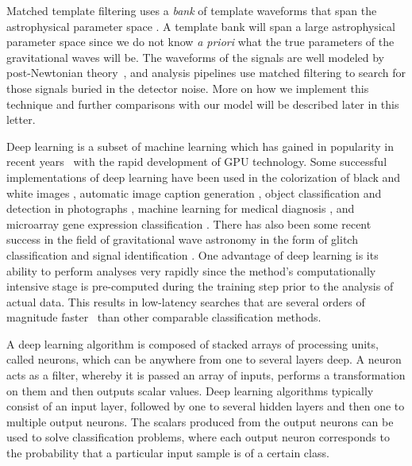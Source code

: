 \documentclass[%
 amsmath,amssymb,
 aps,
 twocolumn,
 prl,
 reprint,
floatfix,
]{revtex4-1}
\begin{document}
%
%
Matched template filtering uses a \textit{bank} of template waveforms that span
the astrophysical parameter space \cite{PhysRevD.44.3819, PhysRevD.49.1707,
PhysRevD.53.6749, PhysRevD.60.022002, 0264-9381-23-18-002, PhysRevD.80.104014, Blanchet2014, PhysRevD.89.061502}. A template bank will span a large astrophysical parameter space since we do not
know \textit{a priori} what the true parameters of the gravitational waves will
be. The waveforms of the signals are well modeled by post-Newtonian
theory~\cite{PhysRevD.84.049901,PhysRevD.80.084043,Blanchet2014,PhysRevD.93.084054},
and analysis pipelines use matched filtering to search for those signals buried
in the detector noise. More on how we implement this technique and further
comparisons with our model will be described later in this letter.

%
%
Deep learning is a subset of machine learning which has gained in popularity in
recent years~\cite{NIPS2012_4824, 1406.2661, 1409.1556, 1412.7062, 1311.2901,
1409.4842} with the rapid development of \ac{GPU} technology. Some successful
implementations of deep learning have been used in the colorization of black
and white images \cite{1603.08511}, automatic image caption generation
\cite{1412.2306}, object classification and detection in photographs
\cite{NIPS2012_4824}, machine learning for medical diagnosis \cite{KONONENKO200189}, and microarray gene expression classification \cite{Pirooznia2008}. There has also been some recent success in the field of gravitational wave astronomy in the form of glitch classification \cite{0264-9381-34-6-064003,1706.07446} and signal identification \cite{1701.00008}. One
advantage of deep learning is its ability to perform analyses very rapidly
since the method's computationally intensive stage is pre-computed during the
training step prior to the analysis of actual data. This results in low-latency
searches that are several orders of magnitude faster~\cite{726791} than other
comparable classification methods. 

%
%
A deep learning algorithm is composed of stacked arrays of processing units, called
neurons, which can be anywhere from one to several layers deep. A neuron acts
as a filter, whereby it is passed an array of inputs, performs a transformation
on them and then outputs scalar values. Deep learning algorithms
typically consist of an input layer, followed by one to several hidden layers
and then one to multiple output neurons. The scalars produced from the output neurons can be used to solve classification problems, where each output neuron corresponds to the probability
that a particular input sample is of a certain class.
\end{document}
